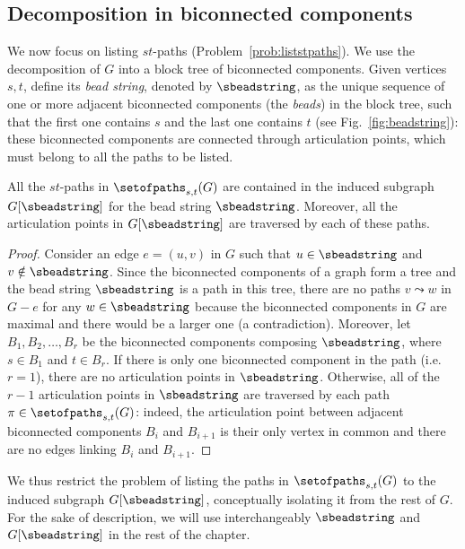 \subsection{Decomposition in biconnected components}
\label{sec:decomposition}


We now focus on listing $st$-paths
(Problem~\ref{prob:liststpaths}). We use the decomposition of $G$ into
a block tree of biconnected components.  Given vertices $s,t$, define
its \emph{bead string}, denoted by $\sbeadstring$, as the unique
sequence of one or more adjacent biconnected components (the
\emph{beads}) in the block tree, such that the first one contains $s$
and the last one contains $t$ (see Fig.~\ref{fig:beadstring}): these
biconnected components are connected through articulation points,
which must belong to all the paths to be listed.

\begin{lemma}
  \label{lemma:beadstring}
  All the $st$-paths in $\setofpaths_{s,t}(G)$ are contained in the
  induced subgraph $G[\sbeadstring]$ for the bead string
  $\sbeadstring$. Moreover, all the articulation points in
  $G[\sbeadstring]$ are traversed by each of these paths.
\end{lemma}
\begin{proof}
  Consider an edge $e = (u,v)$ in $G$ such that $u \in \sbeadstring$
  and $v \notin \sbeadstring$. Since the biconnected components of a
  graph form a tree and the bead string $\sbeadstring$ is a path in
  this tree, there are no paths $v \leadsto w$ in $G-e$ for any $w \in
  \sbeadstring$ because the biconnected components in $G$ are maximal
  and there would be a larger one (a contradiction).
Moreover, let $B_1, B_2, \ldots, B_r$ be the biconnected components
  composing $\sbeadstring$, where $s \in B_1$ and $t \in B_r$. If
  there is only one biconnected component in the path (i.e.~$r=1$),
  there are no articulation points in $\sbeadstring$.  Otherwise, all
  of the $r-1$ articulation points in $\sbeadstring$ are traversed by
  each path $\pi \in \setofpaths_{s,t}(G)$: indeed, the articulation
  point between adjacent biconnected components $B_i$ and $B_{i+1}$ is
  their only vertex in common and there are no edges linking $B_i$ and
  $B_{i+1}$.
\end{proof}

We thus restrict the problem of listing the paths in
$\setofpaths_{s,t}(G)$ to the induced subgraph $G[\sbeadstring]$,
conceptually isolating it from the rest of $G$. For the sake of
description, we will use interchangeably $\sbeadstring$ and
$G[\sbeadstring]$ in the rest of the chapter.

